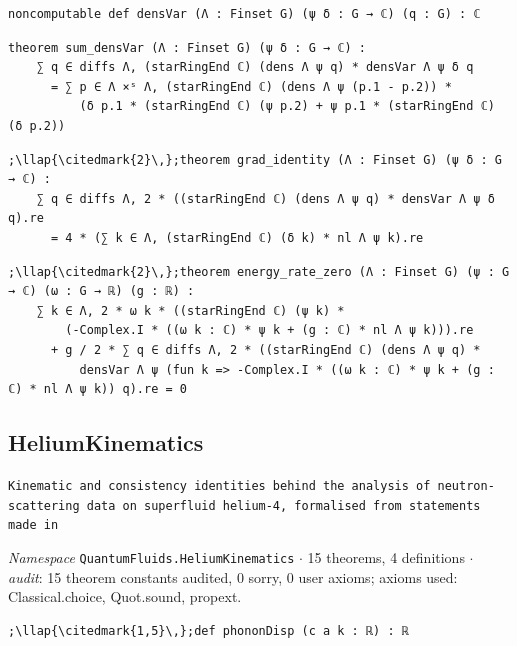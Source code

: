 \begin{lstlisting}[style=leancat]
noncomputable def densVar (Λ : Finset G) (ψ δ : G → ℂ) (q : G) : ℂ
\end{lstlisting}

\begin{lstlisting}[style=leancat]
theorem sum_densVar (Λ : Finset G) (ψ δ : G → ℂ) :
    ∑ q ∈ diffs Λ, (starRingEnd ℂ) (dens Λ ψ q) * densVar Λ ψ δ q
      = ∑ p ∈ Λ ×ˢ Λ, (starRingEnd ℂ) (dens Λ ψ (p.1 - p.2)) *
          (δ p.1 * (starRingEnd ℂ) (ψ p.2) + ψ p.1 * (starRingEnd ℂ) (δ p.2))
\end{lstlisting}

\begin{lstlisting}[style=leancat]
;\llap{\citedmark{2}\,};theorem grad_identity (Λ : Finset G) (ψ δ : G → ℂ) :
    ∑ q ∈ diffs Λ, 2 * ((starRingEnd ℂ) (dens Λ ψ q) * densVar Λ ψ δ q).re
      = 4 * (∑ k ∈ Λ, (starRingEnd ℂ) (δ k) * nl Λ ψ k).re
\end{lstlisting}

\begin{lstlisting}[style=leancat]
;\llap{\citedmark{2}\,};theorem energy_rate_zero (Λ : Finset G) (ψ : G → ℂ) (ω : G → ℝ) (g : ℝ) :
    ∑ k ∈ Λ, 2 * ω k * ((starRingEnd ℂ) (ψ k) *
        (-Complex.I * ((ω k : ℂ) * ψ k + (g : ℂ) * nl Λ ψ k))).re
      + g / 2 * ∑ q ∈ diffs Λ, 2 * ((starRingEnd ℂ) (dens Λ ψ q) *
          densVar Λ ψ (fun k => -Complex.I * ((ω k : ℂ) * ψ k + (g : ℂ) * nl Λ ψ k)) q).re = 0
\end{lstlisting}

\subsection{HeliumKinematics}\label{appA:HeliumKinematics}
{\footnotesize\raggedright\texttt{Kinematic and consistency identities behind the analysis of neutron-\allowbreak{}scattering data on superfluid helium-\allowbreak{}4,\allowbreak{} formalised from statements made in}\par}
{\footnotesize\raggedright\emph{Namespace} \texttt{QuantumFluids.\allowbreak{}HeliumKinematics} $\cdot$ 15 theorems, 4 definitions $\cdot$ \emph{audit}: 15 theorem constants audited, 0 sorry, 0 user axioms; axioms used: Classical.choice, Quot.sound, propext.\par}
\vspace{1pt}
\begin{lstlisting}[style=leancat]
;\llap{\citedmark{1,5}\,};def phononDisp (c a k : ℝ) : ℝ
\end{lstlisting}

